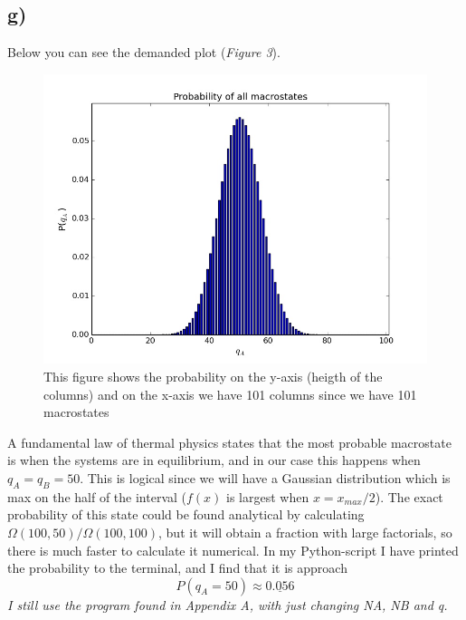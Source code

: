 \documentclass{scrartcl}
\begin{document}
\subsection*{g)}
Below you can see the demanded plot (\textit{Figure 3}).
\begin{figure}[!htbp]
\centering
\includegraphics[width=150mm]{oblig1g1.jpg}
\caption{This figure shows the probability on the y-axis (heigth of the columns) and on the x-axis we have 101 columns since we have 101 macrostates \label{overflow}}
\end{figure}
\par\vspace{3mm}
A fundamental law of thermal physics states that the most probable macrostate is when the systems are in equilibrium, and in our case this happens when $q_A=q_B=50$. This is logical since we will have a Gaussian distribution which is max on the half of the interval ($f(x)$ is largest when $x=x_{max}/2$). The exact probability of this state could be found analytical by calculating $\Omega(100,50)/\Omega(100,100)$, but it will obtain a fraction with large factorials, so there is much faster to calculate it numerical. In my Python-script I have printed the probability to the terminal, and I find that it is approach
$$P(q_A=50)\approx \underline{0.056}$$
\textit{I still use the program found in Appendix A, with just changing NA, NB and q.}
\newpage
\end{document}
